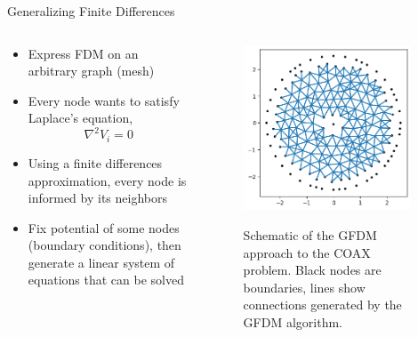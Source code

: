 \documentclass{beamer}
\begin{document}
\begin{frame}{Generalizing Finite Differences}
\begin{columns}
    \begin{column}{0.6\textwidth}
        \begin{itemize}
            \item <1-> Express FDM on an arbitrary graph (mesh)
            \item <1-> Every node wants to satisfy Laplace's equation,
            \begin{equation}
                \nabla^2 V_i = 0
            \end{equation}
            \item <2-> Using a finite differences approximation, every node is informed by its neighbors
            \item <2-> Fix potential of some nodes (boundary conditions), then generate a linear system of equations that can be solved
        \end{itemize}
    \end{column}
    \begin{column}{0.4\textwidth}
        \begin{figure}[h]
            \centering
            \includegraphics[width=0.95\textwidth]{Figures/Coax_GFDM_Connectivity.png}
            \label{fig:coax_gfdm_connectivity}
            \caption{Schematic of the GFDM approach to the COAX problem. Black nodes are boundaries, lines show connections generated by the GFDM algorithm.}
        \end{figure}
    \end{column}
\end{columns}
\end{frame}
\end{document}
